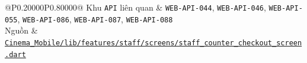 \begin{longtable}{@{}P{0.20000\SRSWidth}P{0.80000\SRSWidth}@{}}
Khu \texttt{API} liên quan & \texttt{WEB-\allowbreak{}API-\allowbreak{}044}, \texttt{WEB-\allowbreak{}API-\allowbreak{}046}, \texttt{WEB-\allowbreak{}API-\allowbreak{}055}, \texttt{WEB-\allowbreak{}API-\allowbreak{}086}, \texttt{WEB-\allowbreak{}API-\allowbreak{}087}, \texttt{WEB-\allowbreak{}API-\allowbreak{}088} \\[3pt]
Nguồn & \href{../../../Cinema\_Mobile/lib/features/staff/screens/staff\_counter\_checkout\_screen.dart}{\texttt{Cinema\_\allowbreak{}Mobile/\allowbreak{}lib/\allowbreak{}features\allowbreak{}/\allowbreak{}staff/\allowbreak{}screens/\allowbreak{}staff\_\allowbreak{}counter\_\allowbreak{}checkout\allowbreak{}\_\allowbreak{}screen.\allowbreak{}dart}} \\[3pt]
\end{longtable}
\endgroup


